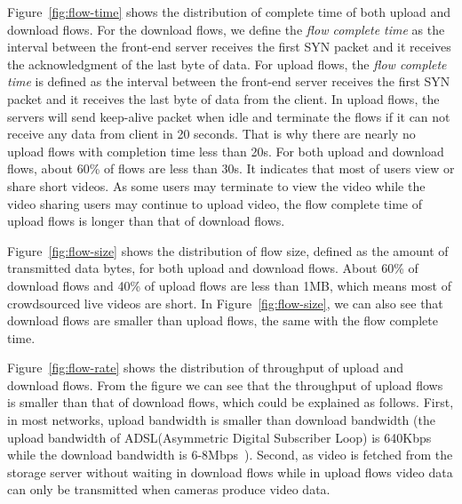 Figure~\ref{fig:flow-time} shows the distribution of complete time of both upload and download flows. For the download flows, we define the \emph{flow complete time} as the interval between the front-end server receives the first SYN packet and it receives the acknowledgment of the last byte of data. For upload flows, the \emph{flow complete time} is defined as the interval between the front-end server receives the first SYN packet and it receives the last byte of data from the client. In upload flows, the servers will send keep-alive packet when idle and terminate the flows if it can not receive any data from client in 20 seconds. That is why there are nearly no upload flows with completion time less than 20s. For both upload and download flows, about 60\% of flows are less than 30s. It indicates that most of users view or share short videos. As some users may terminate to view the video while the video sharing users may continue to upload video, the flow complete time of upload flows is longer than that of download flows.   


Figure~\ref{fig:flow-size} shows the distribution of flow size, defined as the amount of transmitted data bytes, for both upload and download flows. About 60\% of download flows and 40\% of upload flows are less than 1MB, which means most of crowdsourced live videos are short. In Figure~\ref{fig:flow-size}, we can also see that download flows are smaller than upload flows, the same with the flow complete time.


Figure~\ref{fig:flow-rate} shows the distribution of throughput of upload and download flows. From the figure we can see that the throughput of upload flows is smaller than that of download flows, which could be explained as follows. First, in most networks, upload bandwidth is smaller than download bandwidth (\eg the upload bandwidth of ADSL(Asymmetric Digital Subscriber Loop) is 640Kbps while the download bandwidth is 6-8Mbps~\cite{wei2008classification}). Second, as video is fetched from the storage server without waiting in download flows while in upload flows video data can only be transmitted when cameras produce video data. 
